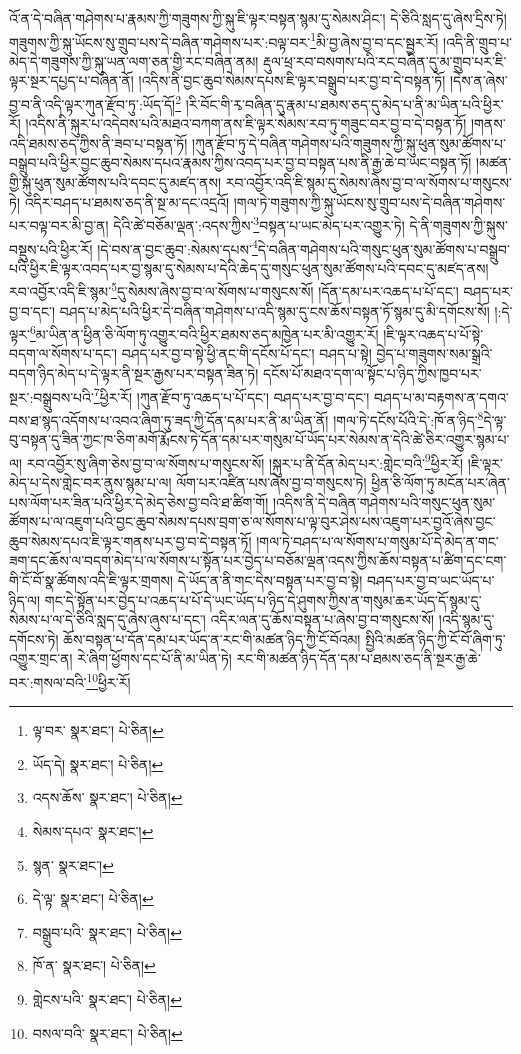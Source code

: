 འོ་ན་དེ་བཞིན་གཤེགས་པ་རྣམས་ཀྱི་གཟུགས་ཀྱི་སྐུ་ཇི་ལྟར་བསྟན་སྙམ་དུ་སེམས་ཤིང་། དེ་ཅིའི་སླད་དུ་ཞེས་དྲིས་ཏེ། གཟུགས་ཀྱི་སྐུ་ཡོངས་སུ་གྲུབ་པས་དེ་བཞིན་གཤེགས་པར་:བལྟ་བར་\footnote{ལྟ་བར་  སྣར་ཐང་།  པེ་ཅིན། }མི་བྱ་ཞེས་བྱ་བ་དང་སྦྱར་རོ། །འདི་ནི་གྲུབ་པ་མེད་དེ་གཟུགས་ཀྱི་སྐུ་ཡན་ལག་ཅན་གྱི་རང་བཞིན་ནམ། རྡུལ་ཕྲ་རབ་བསགས་པའི་རང་བཞིན་དུ་མ་གྲུབ་པར་ཇི་ལྟར་སྔར་དཔྱད་པ་བཞིན་ནོ། །འདིས་ནི་བྱང་ཆུབ་སེམས་དཔས་ཇི་ལྟར་བསྒྲུབ་པར་བྱ་བ་དེ་བསྟན་ཏོ། །དེས་ན་ཞེས་བྱ་བ་ནི་འདི་ལྟར་ཀུན་རྫོབ་ཏུ་:ཡོད་དོ།\footnote{ཡོད་དེ།  སྣར་ཐང་།  པེ་ཅིན། } །རི་བོང་གི་རྭ་བཞིན་དུ་རྣམ་པ་ཐམས་ཅད་དུ་མེད་པ་ནི་མ་ཡིན་པའི་ཕྱིར་རོ། །འདིས་ནི་སྐུར་པ་འདེབས་པའི་མཐའ་བཀག་ནས་ཇི་ལྟར་སེམས་རབ་ཏུ་གཟུང་བར་བྱ་བ་དེ་བསྟན་ཏོ། །གནས་འདི་ཐམས་ཅད་ཀྱིས་ནི་ཟབ་པ་བསྟན་ཏོ། །ཀུན་རྫོབ་ཏུ་དེ་བཞིན་གཤེགས་པའི་གཟུགས་ཀྱི་སྐུ་ཕུན་སུམ་ཚོགས་པ་བསྒྲུབ་པའི་ཕྱིར་བྱང་ཆུབ་སེམས་དཔའ་རྣམས་ཀྱིས་འབད་པར་བྱ་བ་བསྟན་པས་ནི་རྒྱ་ཆེ་བ་ཡང་བསྟན་ཏོ། །མཚན་གྱི་སྐུ་ཕུན་སུམ་ཚོགས་པའི་དབང་དུ་མཛད་ནས། རབ་འབྱོར་འདི་ཇི་སྙམ་དུ་སེམས་ཞེས་བྱ་བ་ལ་སོགས་པ་གསུངས་ཏེ། འདིར་བཤད་པ་ཐམས་ཅད་ནི་སྔ་མ་དང་འདྲའོ། །གལ་ཏེ་གཟུགས་ཀྱི་སྐུ་ཡོངས་སུ་གྲུབ་པས་དེ་བཞིན་གཤེགས་པར་བལྟ་བར་མི་བྱ་ན། དེའི་ཚེ་བཅོམ་ལྡན་:འདས་ཀྱིས་\footnote{འདས་ཆོས་  སྣར་ཐང་།  པེ་ཅིན། }བསྟན་པ་ཡང་མེད་པར་འགྱུར་ཏེ། དེ་ནི་གཟུགས་ཀྱི་སྐུས་བསྡུས་པའི་ཕྱིར་རོ། །དེ་བས་ན་བྱང་ཆུབ་:སེམས་དཔས་\footnote{སེམས་དཔའ་  སྣར་ཐང་། }དེ་བཞིན་གཤེགས་པའི་གསུང་ཕུན་སུམ་ཚོགས་པ་བསྒྲུབ་པའི་ཕྱིར་ཇི་ལྟར་འབད་པར་བྱ་སྙམ་དུ་སེམས་པ་དེའི་ཆེད་དུ་གསུང་ཕུན་སུམ་ཚོགས་པའི་དབང་དུ་མཛད་ནས། རབ་འབྱོར་འདི་ཇི་སྙམ་\footnote{སྙན་  སྣར་ཐང་། }དུ་སེམས་ཞེས་བྱ་བ་ལ་སོགས་པ་གསུངས་སོ། །དོན་དམ་པར་འཆད་པ་པོ་དང་། བཤད་པར་བྱ་བ་དང་། བཤད་པ་མེད་པའི་ཕྱིར་དེ་བཞིན་གཤེགས་པ་འདི་སྙམ་དུ་ངས་ཆོས་བསྟན་ཏོ་སྙམ་དུ་མི་དགོངས་སོ། །:དེ་ལྟར་\footnote{དེ་ལྟ་  སྣར་ཐང་།  པེ་ཅིན། }མ་ཡིན་ན་ཕྱིན་ཅི་ལོག་ཏུ་འགྱུར་བའི་ཕྱིར་ཐམས་ཅད་མཁྱེན་པར་མི་འགྱུར་རོ། །ཇི་ལྟར་འཆད་པ་པོ་སྟེ་བདག་ལ་སོགས་པ་དང་། བཤད་པར་བྱ་བ་སྟེ་ཕྱི་ནང་གི་དངོས་པོ་དང་། བཤད་པ་སྟེ། བྱེད་པ་གཟུགས་སམ་སྒྲའི་བདག་ཉིད་མེད་པ་དེ་ལྟར་ནི་སྔར་རྒྱས་པར་བསྟན་ཟིན་ཏེ། དངོས་པོ་མཐའ་དག་ལ་སྟོང་པ་ཉིད་ཀྱིས་ཁྱབ་པར་སྔར་:བསྒྲུབས་པའི་\footnote{བསྒྲུབ་པའི་  སྣར་ཐང་།  པེ་ཅིན། }ཕྱིར་རོ། །ཀུན་རྫོབ་ཏུ་འཆད་པ་པོ་དང་། བཤད་པར་བྱ་བ་དང་། བཤད་པ་མ་བརྟགས་ན་དགའ་བས་ཐ་སྙད་འདོགས་པ་འབའ་ཞིག་ཏུ་ཟད་ཀྱི་དོན་དམ་པར་ནི་མ་ཡིན་ནོ། །གལ་ཏེ་དངོས་པོའི་དེ་:ཁོ་ན་ཉིད་\footnote{ཁོ་ན་  སྣར་ཐང་།  པེ་ཅིན། }དེ་ལྟ་བུ་བསྟན་དུ་ཟིན་ཀྱང་ཁ་ཅིག་མགོ་རྨོངས་ཏེ་དོན་དམ་པར་གསུམ་པོ་ཡོད་པར་སེམས་ན་དེའི་ཚེ་ཅིར་འགྱུར་སྙམ་པ་ལ། རབ་འབྱོར་སུ་ཞིག་ཅེས་བྱ་བ་ལ་སོགས་པ་གསུངས་སོ། །སྐུར་པ་ནི་དོན་མེད་པར་:གླེང་བའི་\footnote{གླེངས་པའི་  སྣར་ཐང་།  པེ་ཅིན། }ཕྱིར་རོ། །ཇི་ལྟར་མེད་པ་དེས་གླེང་བར་ནུས་སྙམ་པ་ལ། ལོག་པར་འཛིན་པས་ཞེས་བྱ་བ་གསུངས་ཏེ། ཕྱིན་ཅི་ལོག་ཏུ་མངོན་པར་ཞེན་པས་ལོག་པར་ཟིན་པའི་ཕྱིར་དེ་མེད་ཅེས་བྱ་བའི་ཐ་ཚིག་གོ། །འདིས་ནི་དེ་བཞིན་གཤེགས་པའི་གསུང་ཕུན་སུམ་ཚོགས་པ་ལ་འཇུག་པའི་བྱང་ཆུབ་སེམས་དཔས་བྲག་ཅ་ལ་སོགས་པ་ལྟ་བུར་ཤེས་པས་འཇུག་པར་བྱའོ་ཞེས་བྱང་ཆུབ་སེམས་དཔའ་ཇི་ལྟར་གནས་པར་བྱ་བ་དེ་བསྟན་ཏོ། །གལ་ཏེ་བཤད་པ་ལ་སོགས་པ་གསུམ་པོ་དེ་མེད་ན་གང་ཟག་དང་ཆོས་ལ་བདག་མེད་པ་ལ་སོགས་པ་སྟོན་པར་བྱེད་པ་བཅོམ་ལྡན་འདས་ཀྱིས་ཆོས་བསྟན་པ་ཚིག་དང་ངག་གི་ངོ་བོ་སྣ་ཚོགས་འདི་ཇི་ལྟར་གྲགས། དེ་ཡོད་ན་ནི་གང་དེས་བསྟན་པར་བྱ་བ་སྟེ། བཤད་པར་བྱ་བ་ཡང་ཡོད་པ་ཉིད་ལ། གང་དེ་སྟོན་པར་བྱེད་པ་འཆད་པ་པོ་དེ་ཡང་ཡོད་པ་ཉིད་དེ་ཤུགས་ཀྱིས་ན་གསུམ་ཆར་ཡོད་དོ་སྙམ་དུ་སེམས་པ་ལ་དེ་ཅིའི་སླད་དུ་ཞེས་ཞུས་པ་དང་། འདིར་ལན་དུ་ཆོས་བསྟན་པ་ཞེས་བྱ་བ་གསུངས་སོ། །འདི་སྙམ་དུ་དགོངས་ཏེ། ཆོས་བསྟན་པ་དོན་དམ་པར་ཡོད་ན་རང་གི་མཚན་ཉིད་ཀྱི་ངོ་བོའམ། སྤྱིའི་མཚན་ཉིད་ཀྱི་ངོ་བོ་ཞིག་ཏུ་འགྱུར་གྲང་ན། རེ་ཞིག་ཕྱོགས་དང་པོ་ནི་མ་ཡིན་ཏེ། རང་གི་མཚན་ཉིད་དོན་དམ་པ་ཐམས་ཅད་ནི་སྔར་རྒྱ་ཆེ་བར་:གསལ་བའི་\footnote{བསལ་བའི་  སྣར་ཐང་།  པེ་ཅིན། }ཕྱིར་རོ། 